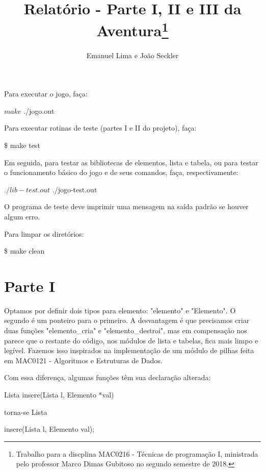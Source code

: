 \documentclass{article}
\title{Relatório - Parte I, II e III da Aventura\footnote{Trabalho para a discplina
    MAC0216 - Técnicas de programação I, ministrada pelo professor Marco Dimas
    Gubitoso no segundo semestre de 2018.}}
\author{Emanuel Lima e João Seckler}
\begin{document}
\maketitle

Para executar o jogo, faça:

\begin{spverbatim}
  $ make
  $ ./jogo.out
\end{spverbatim}
\medskip

Para executar rotinas de teste (partes I e II do projeto), faça:

\begin{spverbatim}
  \$ make test
\end{spverbatim}
\medskip

Em seguida, para testar as bibliotecas de elementos, lista e tabela, ou para
testar o funcionamento básico do jogo e de seus comandos, faça, respectivamente:

\begin{spverbatim}
  $ ./lib-test.out
  $ ./jogo-test.out
\end{spverbatim}
\medskip

O programa de teste deve imprimir uma mensagem na saída padrão se houver algum
erro.

Para limpar os diretórios:

\begin{spverbatim}
  \$ make clean 
\end{spverbatim}
\medskip


\section{Parte I}

Optamos por definir dois tipos para elemento: "elemento" e "Elemento". O segundo é um ponteiro para o primeiro. A desvantagem é que precisamos criar duas funções "elemento\_cria" e "elemento\_destroi", mas em compensação nos parece que o restante do código, nos módulos de lista e tabelas, fica mais limpo e legível. Fazemos isso inspirados na implementação de um módulo de pilhas feita em MAC0121 - Algoritmos e Estruturas de Dados.

Com essa diferença, algumas funções têm sua declaração alterada:

\begin{spverbatim}
  Lista insere(Lista l, Elemento *val)
\end{spverbatim} \medskip
torna-se Lista
\begin{spverbatim}
  insere(Lista l, Elemento val);
\end{spverbatim} \medskip
\end{document}
